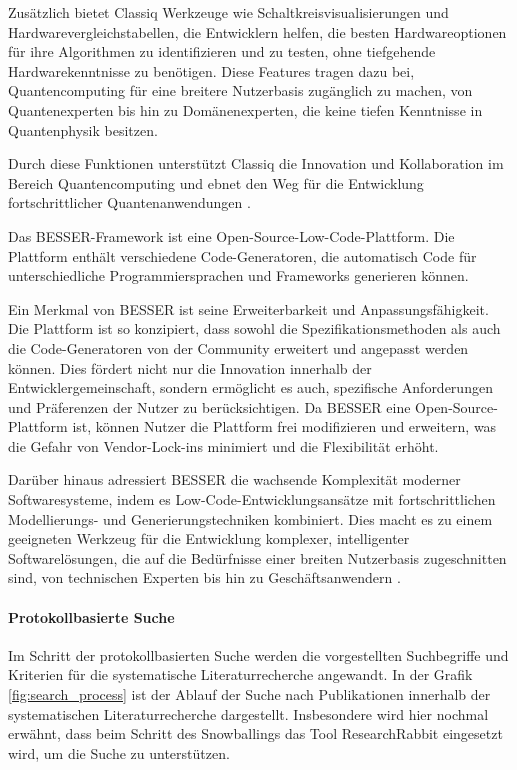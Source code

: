 Zusätzlich bietet Classiq Werkzeuge wie Schaltkreisvisualisierungen und Hardwarevergleichstabellen, die Entwicklern helfen, die 
besten Hardwareoptionen für ihre Algorithmen zu identifizieren und zu testen, ohne tiefgehende Hardwarekenntnisse zu benötigen. 
Diese Features tragen dazu bei, Quantencomputing für eine breitere Nutzerbasis zugänglich zu machen, von 
Quantenexperten bis hin zu Domänenexperten, die keine tiefen Kenntnisse in Quantenphysik besitzen.

Durch diese Funktionen unterstützt Classiq die Innovation und Kollaboration im Bereich Quantencomputing und ebnet den 
Weg für die Entwicklung fortschrittlicher Quantenanwendungen \cite{minerbi2022quantum}. 

Das BESSER-Framework ist eine Open-Source-Low-Code-Plattform. Die Plattform enthält verschiedene Code-Generatoren, die automatisch Code 
für unterschiedliche Programmiersprachen und Frameworks generieren können. 

Ein Merkmal von BESSER ist seine Erweiterbarkeit und Anpassungsfähigkeit. Die Plattform ist so konzipiert, dass sowohl die 
Spezifikationsmethoden als auch die Code-Generatoren von der Community erweitert und angepasst werden können. Dies fördert 
nicht nur die Innovation innerhalb der Entwicklergemeinschaft, sondern ermöglicht es auch, spezifische Anforderungen und 
Präferenzen der Nutzer zu berücksichtigen. Da BESSER eine Open-Source-Plattform ist, können Nutzer die Plattform frei 
modifizieren und erweitern, was die Gefahr von Vendor-Lock-ins minimiert und die Flexibilität erhöht.

Darüber hinaus adressiert BESSER die wachsende Komplexität moderner Softwaresysteme, indem es Low-Code-Entwicklungsansätze mit 
fortschrittlichen Modellierungs- und Generierungstechniken kombiniert. Dies macht es zu einem geeigneten Werkzeug für die Entwicklung 
komplexer, intelligenter Softwarelösungen, die auf die Bedürfnisse einer breiten Nutzerbasis 
zugeschnitten sind, von technischen Experten bis hin zu Geschäftsanwendern \cite{alfonso2024building}.

\paragraph{Protokollbasierte Suche}
Im Schritt der protokollbasierten Suche werden die vorgestellten Suchbegriffe und Kriterien für die systematische Literaturrecherche 
angewandt. 
In der Grafik \ref{fig:search_process} ist der Ablauf der Suche nach Publikationen innerhalb der 
systematischen Literaturrecherche dargestellt. Insbesondere wird hier nochmal erwähnt, dass beim Schritt des 
Snowballings das Tool ResearchRabbit eingesetzt wird, um die Suche zu unterstützen. 

